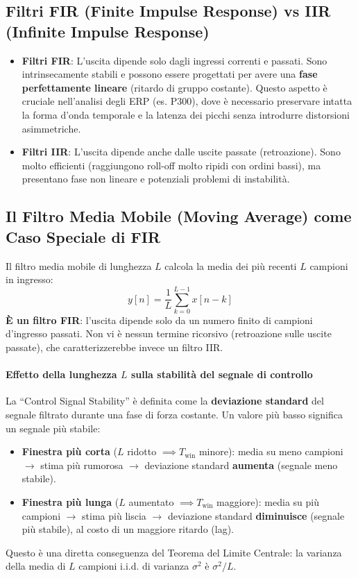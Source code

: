 \documentclass[10pt, letterpaper]{report}
\begin{document}
\subsection{Filtri FIR (Finite Impulse Response) vs IIR (Infinite Impulse Response)}
\begin{itemize}
    \item \textbf{Filtri FIR}: L'uscita dipende solo dagli ingressi correnti e passati.
    Sono intrinsecamente stabili e possono essere progettati per avere una \textbf{fase perfettamente lineare} (ritardo di gruppo costante).
    Questo aspetto è cruciale nell'analisi degli ERP (es. P300), dove è necessario preservare intatta la forma d'onda temporale e la latenza dei picchi senza introdurre distorsioni asimmetriche.
    \item \textbf{Filtri IIR}: L'uscita dipende anche dalle uscite passate (retroazione).
    Sono molto efficienti (raggiungono roll-off molto ripidi con ordini bassi), ma presentano fase non lineare e potenziali problemi di instabilità.
\end{itemize}

\subsection{Il Filtro Media Mobile (Moving Average) come Caso Speciale di FIR}
Il filtro media mobile di lunghezza $L$ calcola la media dei più recenti $L$ campioni in ingresso:
\[
y[n] = \frac{1}{L} \sum_{k=0}^{L-1} x[n-k]
\]
\textbf{È un filtro FIR}: l'uscita dipende solo da un numero finito di campioni d'ingresso passati.
Non vi è nessun termine ricorsivo (retroazione sulle uscite passate), che caratterizzerebbe invece un filtro IIR.

\paragraph{Effetto della lunghezza $L$ sulla stabilità del segnale di controllo}
La ``Control Signal Stability'' è definita come la \textbf{deviazione standard} del segnale filtrato durante una fase di forza costante. Un valore più basso significa un segnale più stabile:
\begin{itemize}
    \item \textbf{Finestra più corta} ($L$ ridotto $\implies T_{\text{win}}$ minore): media su meno campioni $\to$ stima più rumorosa $\to$ deviazione standard \textbf{aumenta} (segnale meno stabile).
    \item \textbf{Finestra più lunga} ($L$ aumentato $\implies T_{\text{win}}$ maggiore): media su più campioni $\to$ stima più liscia $\to$ deviazione standard \textbf{diminuisce} (segnale più stabile), al costo di un maggiore ritardo (lag).
\end{itemize}
Questo è una diretta conseguenza del Teorema del Limite Centrale: la varianza della media di $L$ campioni i.i.d. di varianza $\sigma^2$ è $\sigma^2 / L$.
\end{document}
